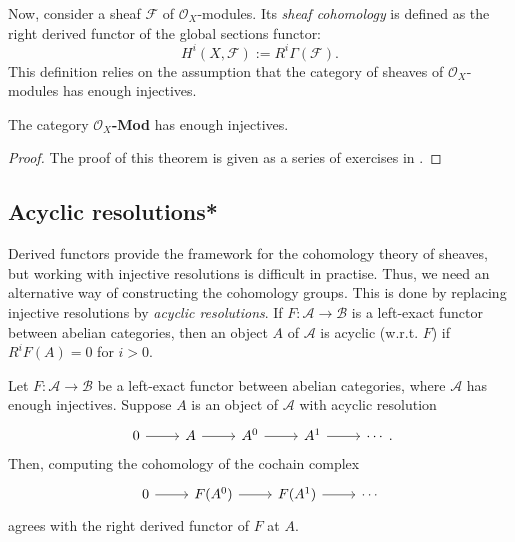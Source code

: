 Now, consider a sheaf $\mathscr{F}$ of $\mathscr{O}_{X}$-modules.
Its \emph{sheaf cohomology} is defined as the right derived functor of
the global sections functor:
\[
  H^{i}(X, \mathscr{F}) := R^{i}\Gamma\left(\mathscr{F}\right).
\]
This definition relies on the assumption that the category of sheaves of
$\mathscr{O}_{X}$-modules has enough injectives.
\begin{thm}\label{thm:enough_injectives}
  The category $\mathscr{O}_{X}$\textup{\textbf{-Mod}} has enough injectives.
\end{thm}
\begin{proof}
  The proof of this theorem is given as a series of exercises in
  \cite{vakil}.
\end{proof}

\subsection{Acyclic resolutions*}
Derived functors provide the framework for the cohomology theory of
sheaves, but working with injective resolutions is difficult in practise.
Thus, we need an alternative way of constructing the cohomology groups.
This is done by replacing injective resolutions by \emph{acyclic
  resolutions}. If $F:\mathcal{A}\to\mathcal{B}$ is a left-exact
functor between abelian categories, then an object $A$ of $\mathcal{A}$ is
acyclic (w.r.t. $F$) if $R^{i}F(A)=0$ for $i>0$.
\begin{lemm}
  Let $F:\mathcal{A}\to\mathcal{B}$ be a left-exact functor
  between abelian categories, where $\mathcal{A}$ has enough injectives.
  Suppose $A$ is an object of $\mathcal{A}$ with acyclic resolution
  \[\begin{tikzcd}
      0\rar & A\rar & A^{0}\rar & A^{1}\rar & \cdots
    \end{tikzcd}.\]
  Then, computing the cohomology of the cochain complex
  \[\begin{tikzcd}
      0\rar & F(A^{0})\rar & F(A^{1})\rar & \cdots
    \end{tikzcd}\]
  agrees with the right derived functor of $F$ at $A$.
\end{lemm}
